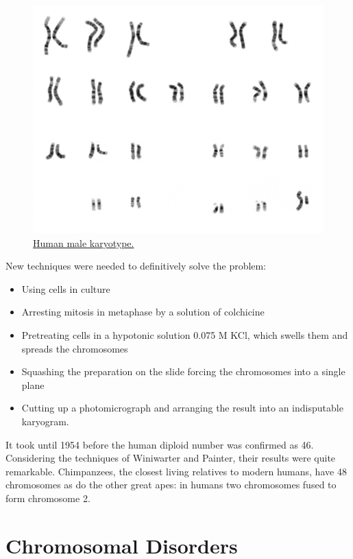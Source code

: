 \begin{figure}

{\centering \includegraphics[width=0.7\linewidth]{./figures/chromosomes/human_male_karyotype} 

}

\caption{\href{https://commons.wikimedia.org/wiki/File:NHGRI_human_male_karyotype.png}{Human male karyotype.}}\label{fig:karyotype}
\end{figure}

New techniques were needed to definitively solve the problem:

\begin{itemize}
\tightlist
\item
  Using cells in culture
\item
  Arresting mitosis in metaphase by a solution of colchicine
\item
  Pretreating cells in a hypotonic solution 0.075 M KCl, which swells them and spreads the chromosomes
\item
  Squashing the preparation on the slide forcing the chromosomes into a single plane
\item
  Cutting up a photomicrograph and arranging the result into an indisputable karyogram.
\end{itemize}

It took until 1954 before the human diploid number was confirmed as 46. Considering the techniques of Winiwarter and Painter, their results were quite remarkable. Chimpanzees, the closest living relatives to modern humans, have 48 chromosomes as do the other great apes: in humans two chromosomes fused to form chromosome 2.

\hypertarget{chromosomal-disorders}{%
\chapter{Chromosomal Disorders}\label{chromosomal-disorders}}


